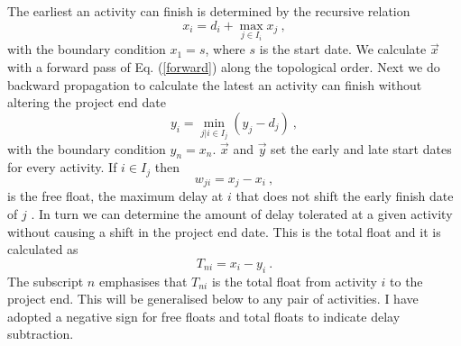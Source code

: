 \documentclass[reprint,aps,prl,amsmath,amssymb,superscriptaddress,showpacs]{revtex4-1}
\begin{document}
The earliest an activity can finish is determined by the recursive relation
%
\begin{equation}
x_i = d_i + \max_{j\in I_i} x_j\ ,
\label{forward} 
\end{equation}
%
with the boundary condition $x_1=s$, where $s$ is the start date. We calculate $\vec{x}$ with a forward pass of  Eq. (\ref{forward}) along the topological order. Next we do backward propagation to calculate the latest an activity can finish without altering the project end date
%
\begin{equation}
y_i = \min_{j | i \in I_j} \left(y_j - d_j\right)\ ,
\label{backward} 
\end{equation}
%
with the boundary condition $y_n=x_n$. $\vec{x}$ and $\vec{y}$ set the early and late start dates for every activity. If $i\in I_j$ then 
%
\begin{equation}
w_{ji} = x_j - x_i\ ,
\label{w}
\end{equation}
%
is the free float, the maximum delay at $i$ that does not shift the early finish date of $j$ \cite{van13}. In turn we can determine the amount of delay tolerated at a given activity without causing a shift in the project end date. This is the total float and it is calculated as
%
\begin{equation}
T_{ni} = x_i-y_i\ .
\label{Tn} 
\end{equation}
%
The subscript $n$ emphasises that $T_{ni}$ is the total float from activity $i$ to the project end. This will be generalised below to any pair of activities. I have adopted a negative sign for free floats and total floats to indicate delay subtraction.
\end{document}
